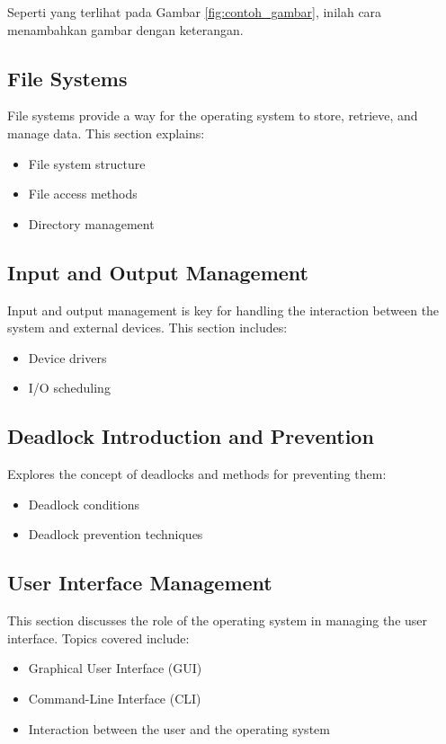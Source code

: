 \documentclass[12pt]{article}
\begin{document}
Seperti yang terlihat pada Gambar \ref{fig:contoh_gambar}, inilah cara menambahkan gambar dengan keterangan.

\subsection{File Systems}
File systems provide a way for the operating system to store, retrieve, and manage data. This section explains:
\begin{itemize}
    \item File system structure
    \item File access methods
    \item Directory management
\end{itemize}

\subsection{Input and Output Management}
Input and output management is key for handling the interaction between the system and external devices. This section includes:
\begin{itemize}
    \item Device drivers
    \item I/O scheduling
\end{itemize}

\subsection{Deadlock Introduction and Prevention}
Explores the concept of deadlocks and methods for preventing them:
\begin{itemize}
    \item Deadlock conditions
    \item Deadlock prevention techniques
\end{itemize}

\subsection{User Interface Management}
This section discusses the role of the operating system in managing the user interface. Topics covered include:
\begin{itemize}
    \item Graphical User Interface (GUI)
    \item Command-Line Interface (CLI)
    \item Interaction between the user and the operating system
\end{itemize}
\end{document}
